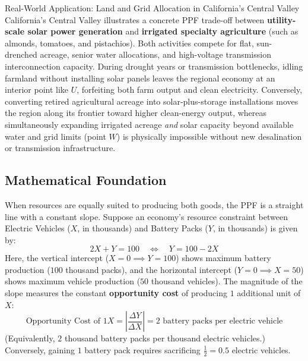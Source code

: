 \documentclass[11pt,letterpaper]{article}
\begin{document}
\begin{examplecase}{Real-World Application: Land and Grid Allocation in California's Central Valley}
California's Central Valley illustrates a concrete PPF trade-off between \textbf{utility-scale solar power generation} and \textbf{irrigated specialty agriculture} (such as almonds, tomatoes, and pistachios). Both activities compete for flat, sun-drenched acreage, senior water allocations, and high-voltage transmission interconnection capacity. During drought years or transmission bottlenecks, idling farmland without installing solar panels leaves the regional economy at an interior point like $U$, forfeiting both farm output and clean electricity. Conversely, converting retired agricultural acreage into solar-plus-storage installations moves the region along its frontier toward higher clean-energy output, whereas simultaneously expanding irrigated acreage \emph{and} solar capacity beyond available water and grid limits (point $W$) is physically impossible without new desalination or transmission infrastructure.
\end{examplecase}

\subsection*{Mathematical Foundation}
When resources are equally suited to producing both goods, the PPF is a straight line with a constant slope. Suppose an economy's resource constraint between Electric Vehicles ($X$, in thousands) and Battery Packs ($Y$, in thousands) is given by:
\begin{equation}
2X + Y = 100 \quad \Longleftrightarrow \quad Y = 100 - 2X
\end{equation}
Here, the vertical intercept ($X = 0 \implies Y = 100$) shows maximum battery production ($100$ thousand packs), and the horizontal intercept ($Y = 0 \implies X = 50$) shows maximum vehicle production ($50$ thousand vehicles). The magnitude of the slope measures the constant \textbf{opportunity cost} of producing $1$ additional unit of $X$:
\begin{equation}
\text{Opportunity Cost of } 1X = \left|\frac{\Delta Y}{\Delta X}\right| = 2 \text{ battery packs per electric vehicle}
\end{equation}
(Equivalently, $2$ thousand battery packs per thousand electric vehicles.) Conversely, gaining $1$ battery pack requires sacrificing $\frac{1}{2} = 0.5$ electric vehicles.
\end{document}
